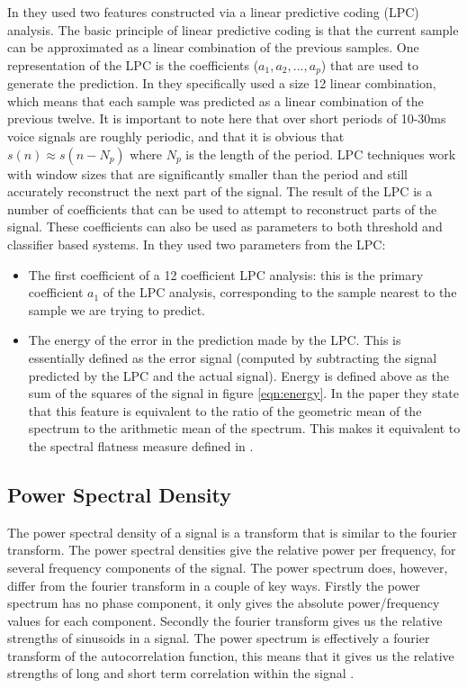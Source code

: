 \documentclass[ %
                    author={Sam Phippen},
                supervisor={Dr. Rafal Bogacz},
                     title={Real time voice activity detectors in noisy personal computing environments},
                  subtitle={},
                    degree={MEng},
                      year={2012} ]{thesis}
\begin{document}
In \cite{atal} they used two features constructed via a linear predictive
coding (LPC) analysis. The basic principle of linear predictive coding is that
the current sample can be approximated as a linear combination of the previous
samples\cite{rabiner}. One representation of the LPC is the coefficients
($a_1,a_2,...,a_p$) that are used to generate the prediction. In \cite{atal}
they specifically used a size 12 linear combination, which means that each
sample was predicted as a linear combination of the previous twelve. It is
important to note here that over short periods of 10-30ms voice signals are
roughly periodic, and that it is obvious that $s(n) \approx s(n-N_p)$ where
$N_p$ is the length of the period. LPC techniques work with window sizes that
are significantly smaller than the period and still accurately reconstruct the
next part of the signal. The result of the LPC is a number of coefficients that
can be used to attempt to reconstruct parts of the signal. These coefficients can
also be used as parameters to both threshold and classifier based systems. In
\cite{atal} they used two parameters from the LPC:

\begin{itemize}

    \item The first coefficient of a 12 coefficient LPC analysis: this is the
        primary coefficient $a_1$ of the LPC analysis, corresponding to the
        sample nearest to the sample we are trying to predict.

    \item The energy of the error in the prediction made by the LPC. This is
        essentially defined as the error signal (computed by subtracting the
        signal predicted by the LPC and the actual signal). Energy is defined
        above as the sum of the squares of the signal in figure
        \ref{eqn:energy}. In the paper they state that this feature is
        equivalent to the ratio of the geometric mean of the spectrum to the
        arithmetic mean of the spectrum. This makes it equivalent to the
        spectral flatness measure defined in \cite{moattar}.

\end{itemize}

\subsection{Power Spectral Density}

The power spectral density of a signal is a transform that is similar to the
fourier transform. The power spectral densities give the relative power per
frequency, for several frequency components of the signal. The power spectrum
does, however, differ from the fourier transform in a couple of key ways.
Firstly the power spectrum has no phase component, it only gives the absolute
power/frequency values for each component. Secondly the fourier transform gives
us the relative strengths of sinusoids in a signal. The power spectrum is
effectively a fourier transform of the autocorrelation function, this means
that it gives us the relative strengths of long and short term correlation
within the signal .\cite{psd}\cite{psd2}
\end{document}
